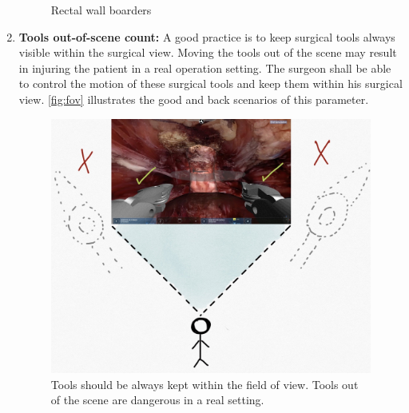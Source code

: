 \begin{enumerate}[start=1,label={Para \#\arabic*, }]
\begin{figure}
  \centering%
  \hfill%
  \caption{Rectal wall boarders}\label{fig:recWalls}
\end{figure}

	\item \textbf{Tools out-of-scene count:} A good practice is to keep surgical tools always visible within the surgical view. Moving the tools out of the scene may result in injuring the patient in a real operation setting. The surgeon shall be able to control the motion of these surgical tools and keep them within his surgical view. \autoref{fig:fov} illustrates the good and back scenarios of this parameter.

  \begin{figure}
    \centering
    \includegraphics[width=.6\textwidth,frame]{figures/validation/fov.JPG}
    \caption{Tools should be always kept within the field of view. Tools out of the scene are dangerous in a real setting.}\label{fig:fov}
  \end{figure}


\end{enumerate}
